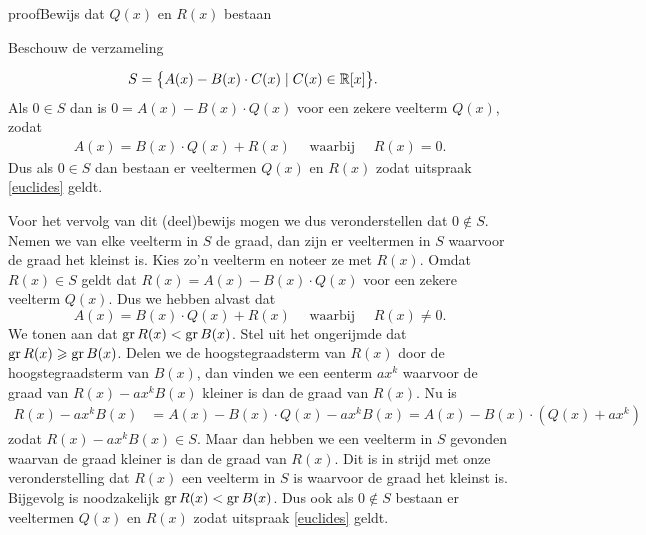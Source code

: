 \documentclass{ximera}
\begin{document}
\begin{expandable}{proof}{Bewijs dat $Q(x)$ en $R(x)$ bestaan}
	
Beschouw de verzameling 

\begin{align*}
S & = \bigl\{ A(x) - B(x)\cdot C(x) \mid C(x) \in \mathbb{R}[x] \bigr\}.  
\end{align*}
Als $0 \in S$ dan is $0 = A(x) - B(x)\cdot Q(x)$ voor een zekere veelterm $Q(x)$, zodat \begin{align*}
A(x) = B(x)\cdot Q(x) + R(x) \quad \text{ waarbij } \quad R(x) = 0.
\end{align*}
Dus als $0 \in S$ dan bestaan er veeltermen $Q(x)$ en $R(x)$ zodat uitspraak \eqref{euclides} geldt. 

Voor het vervolg van dit (deel)bewijs mogen we dus veronderstellen dat $0 \not\in S$. Nemen we van elke veelterm in $S$ de graad, dan zijn er veeltermen in $S$ waarvoor de graad het kleinst is. Kies zo'n veelterm en noteer ze met $R(x)$. Omdat $R(x) \in S$ geldt dat $R(x) = A(x) - B(x)\cdot Q(x)$ voor een zekere veelterm $Q(x)$. Dus we hebben alvast dat
\[
A(x) = B(x)\cdot Q(x) + R(x) \quad \text{ waarbij } \quad R(x) \neq 0.
\]
We tonen aan dat $\operatorname{gr} R(x) < \operatorname{gr} B(x)$. Stel uit het ongerijmde dat $\operatorname{gr} R(x) \geqslant \operatorname{gr} B(x)$. Delen we de hoogstegraadsterm van $R(x)$ door de hoogstegraadsterm van $B(x)$, dan vinden we een eenterm $ax^k$ waarvoor de graad van $R(x) - ax^k B(x)$ kleiner is dan de graad van $R(x)$. Nu is
\begin{align*}
R(x) - ax^k B(x) & = A(x) - B(x)\cdot Q(x) - ax^k B(x) = A(x) - B(x)\cdot (Q(x) + ax^k) 
\end{align*}
zodat $R(x) - ax^k B(x) \in S$. Maar dan hebben we een veelterm in $S$ gevonden waarvan de graad kleiner is dan de graad van $R(x)$. Dit is in strijd  met onze veronderstelling dat $R(x)$ een veelterm in $S$ is waarvoor de graad het kleinst is. Bijgevolg is noodzakelijk $\operatorname{gr} R(x) < \operatorname{gr} B(x)$. Dus ook als $0 \not\in S$ bestaan er veeltermen $Q(x)$ en $R(x)$ zodat uitspraak \eqref{euclides} geldt.

\end{expandable}
\end{document}
